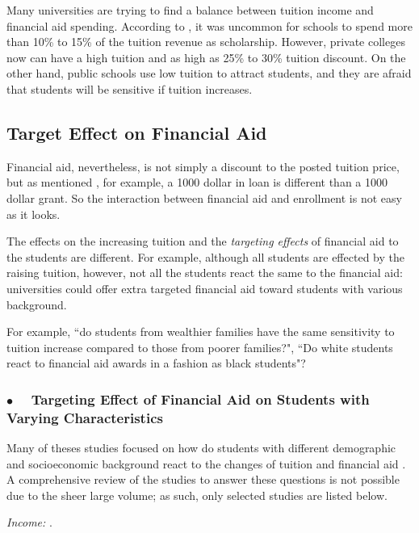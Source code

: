 \documentclass[12pt,english]{report}
\begin{document}
Many universities are trying to find a balance between tuition income and financial aid
spending.  According to \citep{Hossler1998}, it was uncommon for schools to spend more than
10\% to 15\% of the tuition revenue as scholarship. However, private colleges now can have a 
high tuition and as high as 25\% to 30\% tuition discount. On the other hand, public schools
use low tuition to attract students, and they are afraid that students will be sensitive if 
tuition increases.



\subsection{Target Effect on Financial Aid}

Financial aid, nevertheless, is not simply a discount to the posted tuition price, but as 
\citet{Heller1997} mentioned , for example, a 1000 dollar in loan is different 
than a 1000 dollar grant. So the interaction between financial aid and enrollment is 
not easy as it looks.

The effects on the increasing tuition and the \textit{targeting effects} of financial aid to
the students are different. For example, although all students are effected by the raising 
tuition, however, not all the students react the same to the financial aid: universities could
offer extra targeted financial aid toward students with various background.

For example, ``do students from wealthier families have the same sensitivity to tuition 
increase compared to those from poorer families?",  ``Do white students react to financial aid 
awards in a fashion as black students"?

\subsubsection{$\bullet \quad$  Targeting Effect of Financial Aid on Students with Varying 
Characteristics }
Many of theses studies focused on how do students with different demographic and 
socioeconomic background react to the changes of tuition and financial aid
\citep{Jackson1978,Braunstein1999,Heller1997}.  A comprehensive review of the studies to 
answer  these questions is not possible due to the sheer large volume; as such, only selected 
studies  are listed below.

\vspace{0.15in}
\noindent \textit{Income:}  \citep{Crouse2015}.
\end{document}
